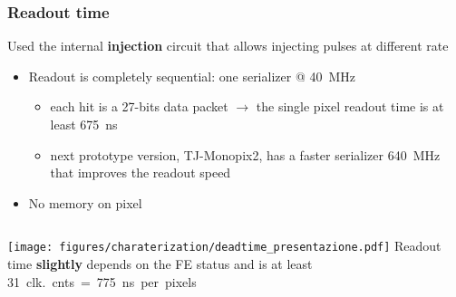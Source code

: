     \begin{frame}
        \frametitle{Readout time}
        Used the internal \textbf{injection} circuit that allows injecting pulses at different rate 
        \begin{itemize}
            \item Readout is completely sequential: one serializer @ \SI{40}{MHz}
            \begin{itemize}
                \item each hit is a 27-bits data packet $\rightarrow$ the single pixel readout time is at least \SI{675}{ns} 
                \item next prototype version, TJ-Monopix2, has a faster serializer \SI{640}{MHz} that improves the readout speed 
            \end{itemize}
            \item No memory on pixel
        \end{itemize}

        \medskip
        \begin{columns}
                \texttt{[image: figures/charaterization/deadtime\_presentazione.pdf]}
            Readout time \textbf{slightly} depends on the FE status and is at least \SI{31}{clk.}cnts = \SI{775}{ns} per pixels 

        \end{columns}            
    \end{frame}          